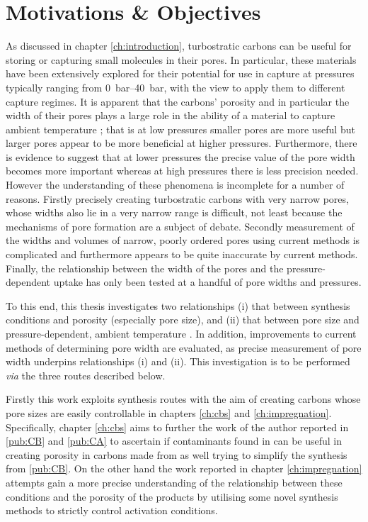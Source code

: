 \chapter{Motivations \& Objectives}
\label{ch:motivations_objectives} 

As discussed in chapter \ref{ch:introduction}, \glspl{turbostratic carbon} can be useful for storing or capturing small molecules in their pores. In particular, these materials have been extensively explored for their potential for use in  capture at pressures typically ranging from \qtyrange{0}{40}{\bar}, with the view to apply them to different  capture regimes. It is apparent that the carbons' porosity and in particular the width of their pores plays a large role in the ability of a material to capture ambient temperature ; that is at low pressures smaller pores are more useful but larger pores appear to be more beneficial at higher pressures. Furthermore, there is evidence to suggest that at lower pressures the precise value of the pore width becomes more important whereas at high pressures there is less precision needed. However the understanding of these phenomena is incomplete for a number of reasons. Firstly precisely creating \glspl{turbostratic carbon} with very narrow pores, whose widths also lie in a very narrow range is difficult, not least because the mechanisms of pore formation are a subject of debate. Secondly measurement of the widths and volumes of narrow, poorly ordered pores using current methods is complicated and furthermore appears to be quite inaccurate by current methods. Finally, the relationship between the width of the pores and the pressure-dependent  uptake has only been tested at a handful of pore widths and pressures.  

To this end, this thesis investigates two relationships (i) that between synthesis conditions and porosity (especially pore size), and (ii) that between pore size and pressure-dependent, ambient temperature . In addition, improvements to current methods of determining pore width are evaluated, as precise measurement of pore width underpins relationships (i) and (ii). This investigation is to be performed \textit{via} the three routes described below.

Firstly this work exploits synthesis routes with the aim of creating carbons whose pore sizes are easily controllable in chapters \ref{ch:cbs} and \ref{ch:impregnation}. Specifically, chapter \ref{ch:cbs} aims to further the work of the author reported in \ref{pub:CB} and \ref{pub:CA} to ascertain if contaminants found in  can be useful in creating porosity in carbons made from  as well trying to simplify the synthesis from \ref{pub:CB}. On the other hand the work reported in chapter \ref{ch:impregnation} attempts gain a more precise understanding of the relationship between these conditions and the porosity of the products by utilising some novel synthesis methods to strictly control activation conditions. 

